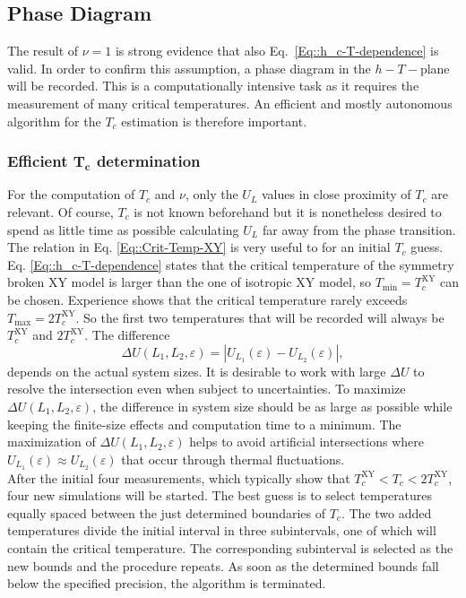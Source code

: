 	
	\subsection{Phase Diagram} \label{Section::Phase-Diagram}
	The result of $\nu = 1$ is strong evidence that also Eq.~\eqref{Eq::h_c-T-dependence} is valid. In order to confirm this assumption, a phase diagram in the $h-T-$plane will be recorded. This is a computationally intensive task as it requires the measurement of many critical temperatures. An efficient and mostly autonomous algorithm for the $T_c$ estimation is therefore important.
	
	\subsubsection{Efficient $\boldsymbol{T_c}$ determination} \label{Section::efficient-crit-temp}
	For the computation of $T_c$ and $\nu$, only the $U_L$ values in close proximity of $T_c$ are relevant. Of course, $T_c$ is not known beforehand but it is nonetheless desired to spend as little time as possible calculating $U_L$ far away from the phase transition. The relation in Eq. \eqref{Eq::Crit-Temp-XY} is very useful to for an initial $T_c$ guess. Eq. \eqref{Eq::h_c-T-dependence} states that the critical temperature of the symmetry broken XY model is larger than the one of isotropic XY model, so $T_{\text{min}} = T_c^{\text{XY}}$ can be chosen. Experience shows that the critical temperature rarely exceeds $T_{\text{max}} = 2 T_c^{\text{XY}}$. So the first two temperatures that will be recorded will always be $T_c^{\text{XY}}$ and $2T_c^{\text{XY}}$. The difference
	\begin{equation}
		\Delta U (L_1, L_2, \varepsilon) =	|U_{L_1}(\varepsilon) - U_{L_2}(\varepsilon)|,
	\end{equation}
	depends on the actual system sizes. It is desirable to work with large $\Delta U$ to resolve the intersection even when subject to uncertainties. To maximize $\Delta U(L_1, L_2, \varepsilon)$, the difference in system size should be as large as possible while keeping the finite-size effects and computation time to a minimum. The maximization of $\Delta U (L_1, L_2, \varepsilon)$ helps to avoid artificial intersections where $U_{L_1}(\varepsilon) \approx U_{L_2}(\varepsilon)$ that occur through thermal fluctuations. \\
	
	After the initial four measurements, which typically show that $T_c^{\text{XY}}  < T_c < 2 T_c^{\text{XY}}$, four new simulations will be started. The best guess is to select temperatures equally spaced between the just determined boundaries of $T_c$. The two added temperatures divide the initial interval in three subintervals, one of which will contain the critical temperature. The corresponding subinterval is selected as the new bounds and the procedure repeats. As soon as the determined bounds fall below the specified precision, the algorithm is terminated.\\
	
